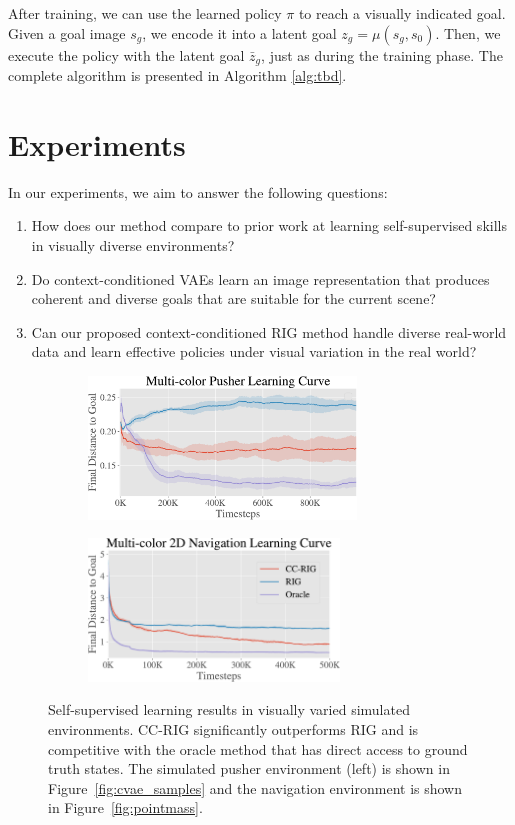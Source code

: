 \documentclass{article}
\begin{document}
After training, we can use the learned policy $\pi$ to reach a visually indicated goal.
Given a goal image $s_g$, we encode it into a latent goal $z_g = \mu(s_g, s_0)$.
Then, we execute the policy with the latent goal $\bar{z}_g$, just as during the training phase.
The complete algorithm is presented in Algorithm \ref{alg:tbd}.

\section{Experiments}

In our experiments, we aim to answer the following questions:
\begin{enumerate}
    \item How does our method compare to prior work at learning self-supervised skills in visually diverse environments?
    \item Do context-conditioned VAEs learn an image representation that produces coherent and diverse goals that are suitable for the current scene?
    \item Can our proposed context-conditioned RIG method handle diverse real-world data and learn effective policies under visual variation in the real world?
\end{enumerate}

\begin{figure}[t]
    \centering
    \begin{subfigure}[b]{0.48\textwidth}
        \center
        \includegraphics[height=3.8cm]{img/final_pusher3-crop.pdf}
    \end{subfigure}
    \hspace{0.3cm}
    \begin{subfigure}[b]{0.48\textwidth}
        \includegraphics[height=3.8cm]{img/final_pointmass1-crop.pdf}
    \end{subfigure}
    \caption{Self-supervised learning results in visually varied simulated environments. CC-RIG significantly outperforms RIG and is competitive with the oracle method that has direct access to ground truth states. The simulated pusher environment (left) is shown in Figure~\ref{fig:cvae_samples} and the navigation environment is shown in Figure~\ref{fig:pointmass}.}
    \vspace{-0.2in}
    \label{fig:sim-learning-curves}
\end{figure}
\end{document}
